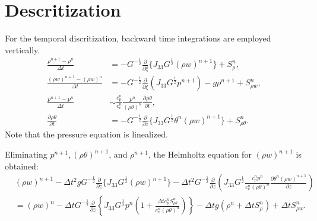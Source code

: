 \section{Descritization}

For the temporal discritization, backward time integrations are employed vertically.
\begin{align}
  \frac{\rho^{n+1}-\rho^n}{\Delta t}
  &= -G^{-\frac{1}{2}}\frac{\partial}{\partial \xi}\{J_{33}G^{\frac{1}{2}}(\rho w)^{n+1}\} + S_\rho^n, \\
  \frac{(\rho w)^{n+1}-(\rho w)^n}{\Delta t}
  &= -G^{-\frac{1}{2}}\frac{\partial}{\partial \xi}(J_{33}G^{\frac{1}{2}}p^{n+1}) -g\rho^{n+1} + S_{\rho w}^n, \\
  \frac{p^{n+1} - p^n}{\Delta t}
  &\sim \frac{c_p^n}{c_v^n} \frac{p^n}{(\rho\theta)^n}\frac{\partial \rho\theta}{\partial t}, \\
  \frac{\partial \rho\theta}{\partial t}
  &= -G^{-\frac{1}{2}}\frac{\partial}{\partial z}\{J_{33}G^{\frac{1}{2}}\theta^n (\rho w)^{n+1}\} + S_{\rho\theta}^n.
\end{align}
Note that the pressure equation is linealized.

Eliminating $p^{n+1}, (\rho\theta)^{n+1}$, and $\rho^{n+1}$, the Helmholtz equation for $(\rho w)^{n+1}$ is obtained:
\begin{align}
  &
  (\rho w)^{n+1}
  - \Delta t^2 g G^{-\frac{1}{2}}\frac{\partial}{\partial z} \{J_{33}G^{\frac{1}{2}}(\rho w)^{n+1}\}
  - \Delta t^2 G^{-\frac{1}{2}}\frac{\partial}{\partial z}\left(J_{33}G^{\frac{1}{2}}\frac{c_p^n p^n}{c_v^n (\rho\theta)^n}\frac{\partial \theta^n (\rho w)^{n+1}}{\partial z}\right) \nonumber\\
  &= (\rho w)^n
  - \Delta t G^{-\frac{1}{2}}\frac{\partial}{\partial z}\left\{J_{33}G^{\frac{1}{2}}p^n\left(1+\frac{\Delta t c_p^n S_{\rho\theta}^n}{c_v^n (\rho\theta)^n}\right)\right\}
  - \Delta t g (\rho^n + \Delta t S_\rho^n)
  + \Delta t S_{\rho w}^n.
\end{align}

